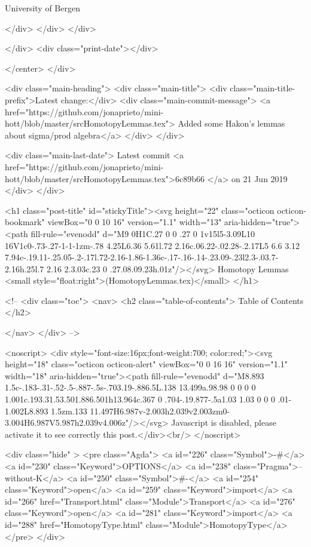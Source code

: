                   University of Bergen
                
                </div>
            </div>
          </div>
          
          
        </div>
        <div class="print-date"></div>
        
        
    </center>
  </div>

  
  <div class="main-heading">
    <div class="main-title">
      <div class="main-title-prefix">Latest change:</div>
      <div class="main-commit-message">
            <a href="https://github.com/jonaprieto/mini-hott/blob/master/srcHomotopyLemmas.tex">
              Added some Hakon's lemmas about sigma/prod algebra</a>
      </div>
    </div>

    <div class="main-last-date">
      Latest commit <a href="https://github.com/jonaprieto/mini-hott/blob/master/srcHomotopyLemmas.tex">6c89b66 </a> on  21 Jun 2019
    </div>
  </div>
  

  <h1 class="post-title" id="stickyTitle"><svg height="22" class="octicon octicon-bookmark" viewBox="0 0 10 16" version="1.1" width="13" aria-hidden="true"><path fill-rule="evenodd" d="M9 0H1C.27 0 0 .27 0 1v15l5-3.09L10 16V1c0-.73-.27-1-1-1zm-.78 4.25L6.36 5.61l.72 2.16c.06.22-.02.28-.2.17L5 6.6 3.12 7.94c-.19.11-.25.05-.2-.17l.72-2.16-1.86-1.36c-.17-.16-.14-.23.09-.23l2.3-.03.7-2.16h.25l.7 2.16 2.3.03c.23 0 .27.08.09.23h.01z"/></svg> Homotopy Lemmas <small style="float:right">(HomotopyLemmas.tex)</small>
  </h1>

  <!-- 
  <div class="toc">
    <nav>
    <h2 class="table-of-contents"> Table of Contents </h2>
      

    </nav>
  </div>
   -->

  <noscript>
  <div style="font-size:16px;font-weight:700; color:red;"><svg height="18" class="octicon octicon-alert" viewBox="0 0 16 16" version="1.1" width="18" aria-hidden="true"><path fill-rule="evenodd" d="M8.893 1.5c-.183-.31-.52-.5-.887-.5s-.703.19-.886.5L.138 13.499a.98.98 0 0 0 0 1.001c.193.31.53.501.886.501h13.964c.367 0 .704-.19.877-.5a1.03 1.03 0 0 0 .01-1.002L8.893 1.5zm.133 11.497H6.987v-2.003h2.039v2.003zm0-3.004H6.987V5.987h2.039v4.006z"/></svg> Javascript is disabled, please activate it to see correctly this post.</div><br/>
  </noscript>

  <div class="hide" >
<pre class="Agda">
<a id="226" class="Symbol">{-#</a> <a id="230" class="Keyword">OPTIONS</a> <a id="238" class="Pragma">--without-K</a> <a id="250" class="Symbol">#-}</a>
<a id="254" class="Keyword">open</a> <a id="259" class="Keyword">import</a> <a id="266" href="Transport.html" class="Module">Transport</a>
<a id="276" class="Keyword">open</a> <a id="281" class="Keyword">import</a> <a id="288" href="HomotopyType.html" class="Module">HomotopyType</a>
</pre>
</div>


